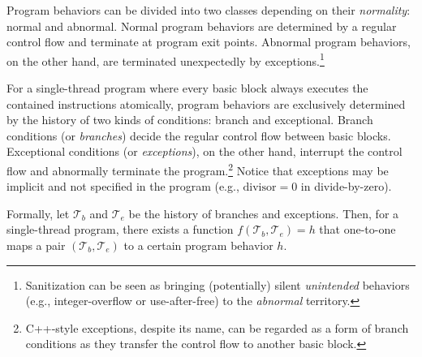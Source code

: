 \documentclass[letterpaper,twocolumn,10pt]{article}
\begin{document}
%
Program behaviors can be divided into two classes depending on their
\emph{normality}: normal and abnormal. Normal program behaviors are determined
by a regular control flow and terminate at program exit points.  Abnormal
program behaviors, on the other hand, are terminated unexpectedly by
exceptions.\footnote{Sanitization can be seen as bringing (potentially) silent
\emph{unintended} behaviors (e.g., integer-overflow or use-after-free) to the
\emph{abnormal} territory.}

%
For a single-thread program where every basic block always executes the
contained instructions atomically, program behaviors are exclusively
determined by the history of two kinds of conditions: branch and exceptional.
Branch conditions (or \emph{branches}) decide the regular control flow between
basic blocks. Exceptional conditions (or \emph{exceptions}), on the other hand,
interrupt the control flow and abnormally terminate the
program.\footnote{C++-style exceptions, despite its name, can be regarded as a
form of branch conditions as they transfer the control flow to another basic
block.} Notice that exceptions may be implicit and not specified in the
program (e.g., $\mathrm{divisor}=0$ in divide-by-zero).


Formally, let $\mathcal{T}_b$ and $\mathcal{T}_e$ be the history of branches and
exceptions. Then, for a single-thread program, there exists a function
$f(\mathcal{T}_b, \mathcal{T}_e) = h$ that one-to-one maps a pair
$(\mathcal{T}_b, \mathcal{T}_e)$ to a certain program behavior $h$.
%

\end{document}
